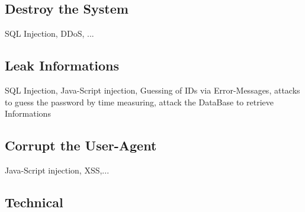 \subsection{Destroy the System}
SQL Injection, DDoS, ...

\subsection{Leak Informations}
SQL Injection, Java-Script injection, Guessing of IDs via Error-Messages, 
attacks to guess the password by time measuring, attack the DataBase to retrieve Informations

\subsection{Corrupt the User-Agent}
Java-Script injection, XSS,...

\subsection{Technical}




